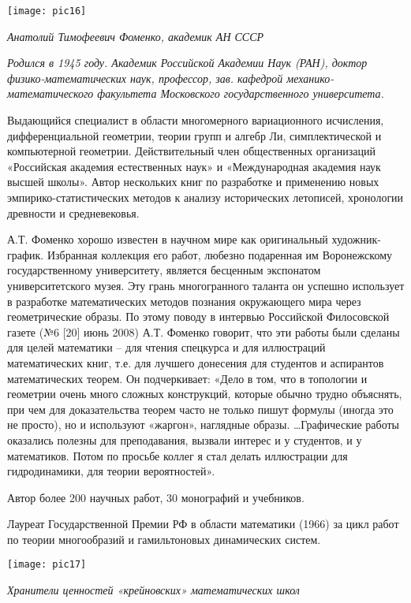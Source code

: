 \begin{center}

\texttt{[image: pic16]}


{\it Анатолий Тимофеевич Фоменко, академик АН СССР}
\end{center}

{\it Родился в 1945 году. Академик Российской Академии Наук (РАН), доктор физико-математических наук, профессор, зав. кафедрой механико-математического факультета Московского государственного университета.

Выдающийся специалист в области многомерного вариационного исчисления, дифференциальной геометрии, теории групп и алгебр Ли, симплектической и компьютерной геометрии. Действительный член общественных организаций «Российская академия естественных наук» и «Международная академия наук высшей школы». Автор нескольких книг по разработке и применению новых эмпирико-статистических методов к анализу исторических летописей, хронологии древности и средневековья.

А.Т. Фоменко хорошо известен в научном мире как оригинальный художник-график. Избранная коллекция его работ, любезно подаренная им Воронежскому государственному университету, является бесценным экспонатом университетского музея. Эту грань многогранного таланта он успешно использует в разработке математических методов познания окружающего мира через геометрические образы. По этому поводу в интервью Российской Филосовской газете (№6 [20] июнь 2008) А.Т. Фоменко говорит, что эти работы были сделаны для целей математики – для чтения спецкурса и для иллюстраций математических книг, т.е. для лучшего донесения для студентов и аспирантов математических теорем.  Он подчеркивает: «Дело в том, что в топологии и геометрии очень много сложных конструкций, которые обычно трудно объяснять, при чем для доказательства теорем часто не только пишут формулы (иногда это не просто), но и используют «жаргон», наглядные образы. …Графические работы оказались полезны для преподавания, вызвали интерес и у студентов, и у математиков. Потом по просьбе коллег я стал делать иллюстрации для гидродинамики, для теории вероятностей».

Автор более 200 научных работ, 30 монографий и учебников.

Лауреат Государственной Премии РФ в области математики (1966) за цикл работ по теории многообразий и гамильтоновых динамических систем.}


\begin{center}

\texttt{[image: pic17]}


{\it Хранители ценностей
«крейновских» математических школ
}
\end{center}

